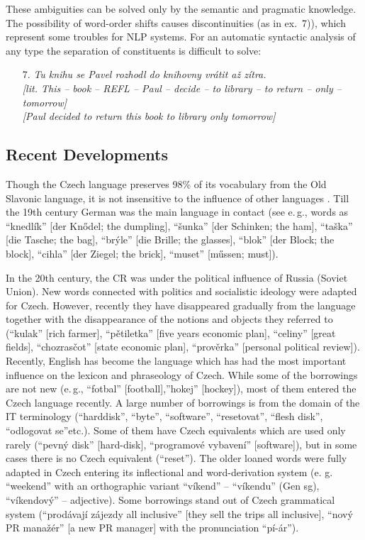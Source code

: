 \begin{multicols}{2}
These ambiguities can be solved only by the semantic and pragmatic knowledge. The possibility of word-order shifts causes discontinuities (as in ex.~7)), which represent some troubles for NLP systems. For an automatic syntactic analysis of any type the separation of constituents is difficult to solve:

\begin{enumerate}
\item[7.]	\textit{Tu knihu se Pavel rozhodl do knihovny vrátit až zítra.}\\
 \textit{{[}lit. This – book – REFL – Paul – decide – to library – to return – only – tomorrow{]}}\\
 \textit{{[}Paul decided to return this book to library only tomorrow{]}}
\end{enumerate}

\subsection{Recent Developments}

Though the Czech language preserves 98\% of its vocabulary from the Old Slavonic language, it is not insensitive to the influence of other languages \cite{Note5}. Till the 19th century German was the main language in contact (see e.\,g., words as “knedlík” {[}der Knődel; the dumpling{]}, “šunka” {[}der Schinken; the ham{]}, “taška” {[}die Tasche; the bag{]}, “brýle” {[}die Brille; the glasses{]}, “blok” {[}der Block; the block{]}, “cihla” {[}der Ziegel; the brick{]}, “muset” {[}műssen; must{]}).

In the 20th century, the CR was under the political influence of Russia (Soviet Union). New words connected with politics and socialistic ideology were adapted for Czech. However, recently they have disappeared gradually from the language together with the disappearance of the notions and objects they referred to (“kulak” {[}rich farmer{]}, “pětiletka” {[}five years economic plan{]}, “celiny” {[}great fields{]}, “chozrasčot” {[}state economic plan{]},  “prověrka” {[}personal political review{]}).
Recently, English has become the language which has had the most important influence on the lexicon and phraseology of Czech. While some of the borrowings are not new (e.\,g., “fotbal” {[}football{]},”hokej” {[}hockey{]}), most of them entered the Czech language recently. A large number of borrowings is from the domain of the IT terminology (“harddisk”, “byte”, “software”, “resetovat”, “flesh disk”, “odlogovat se”etc.). Some of them have Czech equivalents which are used only rarely (“pevný disk” {[}hard-disk{]}, “programové vybavení” {[}software{]}), but in some cases there is no Czech equivalent (“reset”).
The older loaned words were fully adapted in Czech entering its inflectional and word-derivation system (e. g. “weekend” with an orthographic variant “víkend” – “víkendu” (Gen sg), “víkendový” – adjective). Some borrowings stand out of Czech grammatical system (“prodávají zájezdy all inclusive” {[}they sell the trips all inclusive{]}, “nový PR manažér” {[}a new PR manager{]} with the pronunciation “pí-ár”).


\end{multicols}
